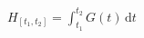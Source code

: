 \documentclass[border=3pt]{standalone}
\begin{document}
\pagecolor{bg}\color{fg}
$\displaystyle H_{[t_1,t_2]}=\int_{t_1}^{t_2}G(t)\,\mathrm{d}t$
\end{document}
